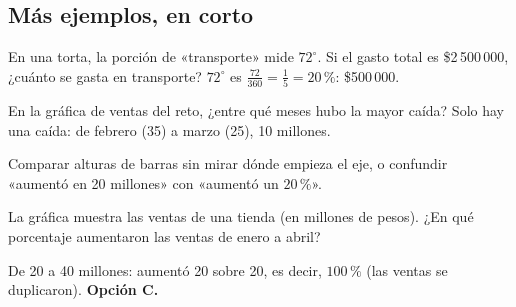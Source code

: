 \subsection{Más ejemplos, en corto}
\begin{ejemplo}
En una torta, la porción de «transporte» mide $72^\circ$. Si el gasto total es \$2\,500\,000, ¿cuánto se gasta en
transporte?
\solucion $72^\circ$ es $\tfrac{72}{360} = \tfrac15 = 20\,\%$: \$500\,000.
\end{ejemplo}

\begin{ejemplo}
En la gráfica de ventas del reto, ¿entre qué meses hubo la mayor caída?
\solucion Solo hay una caída: de febrero (35) a marzo (25), 10 millones.
\end{ejemplo}

\begin{trampa}
Comparar alturas de barras sin mirar dónde empieza el eje, o confundir «aumentó en 20 millones» con «aumentó un $20\,\%$».
\end{trampa}

\begin{reto}
La gráfica muestra las ventas de una tienda (en millones de pesos). ¿En qué porcentaje aumentaron las ventas de enero a
abril?
\begin{center}
\end{center}
\end{reto}

\begin{retoresuelto}
De 20 a 40 millones: aumentó 20 sobre 20, es decir, $100\,\%$ (las ventas se duplicaron). \textbf{Opción C.}
\end{retoresuelto}

